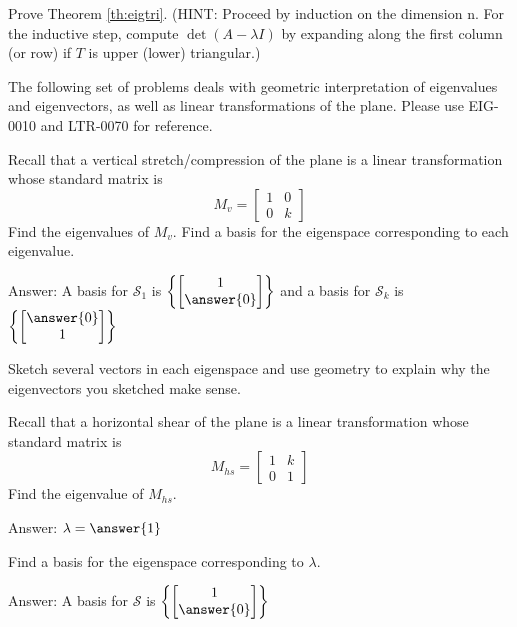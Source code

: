 \documentclass{ximera}
\begin{document}
\begin{problem}\label{prob:eigtri}
Prove Theorem \ref{th:eigtri}.  (HINT:  Proceed by induction on the dimension n.  For the inductive step, compute $\det(A-\lambda I)$ by expanding along the first column (or row) if $T$ is upper (lower) triangular.)
\end{problem}

\begin{problem}
The following set of problems deals with geometric interpretation of eigenvalues and eigenvectors, as well as linear transformations of the plane.  Please use EIG-0010 and LTR-0070 for reference.
\begin{problem}\label{prob:eigvectorstransfr2_1}
Recall that a vertical stretch/compression of the plane is a linear transformation whose standard matrix is $$M_v=\begin{bmatrix}1&0\\0&k\end{bmatrix}$$
Find the eigenvalues of $M_v$.  Find a basis for the eigenspace corresponding to each eigenvalue.

Answer:  A basis for $\mathcal{S}_1$ is $\left\{\begin{bmatrix}1\\\answer{0}\end{bmatrix}\right\}$
and a basis for $\mathcal{S}_k$ is $\left\{\begin{bmatrix}\answer{0}\\1\end{bmatrix}\right\}$

Sketch several vectors in each eigenspace and use geometry to explain why the eigenvectors you sketched make sense.
\end{problem}

\begin{problem}\label{prob:eigvectorstransfr2_2}
Recall that a horizontal shear of the plane is a linear transformation whose standard matrix is $$M_{hs}=\begin{bmatrix}1&k\\0&1\end{bmatrix}$$
Find the eigenvalue of $M_{hs}$.  

Answer: $\lambda=\answer{1}$

Find a basis for the eigenspace corresponding to $\lambda$.

Answer:  A basis for $\mathcal{S}$ is $\left\{\begin{bmatrix}1\\\answer{0}\end{bmatrix}\right\}$


\end{problem}
\end{problem}
\end{document}
